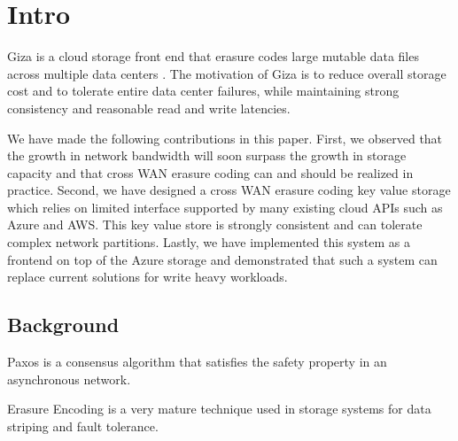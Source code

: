 \section{Intro}
Giza is a cloud storage front end that erasure codes large mutable data files across multiple data centers . The motivation of Giza is to reduce overall storage cost and to tolerate entire data center failures, while maintaining strong consistency and reasonable read and write latencies.
\par
We have made the following contributions in this paper. First, we observed that the growth in network bandwidth will soon surpass the growth in storage capacity and that cross WAN erasure coding can and should be realized in practice. Second, we have designed a cross WAN erasure coding key value storage which relies on limited interface supported by many existing cloud APIs such as Azure and AWS. This key value store is strongly consistent and can tolerate complex network partitions. Lastly, we have implemented this system as a frontend on top of the Azure storage and demonstrated that such a system can replace current solutions for write heavy workloads.

\subsection{Background}
Paxos is a consensus algorithm that satisfies the safety property in an asynchronous network. 
\par
Erasure Encoding is a very mature technique used in storage systems for data striping and fault tolerance.
